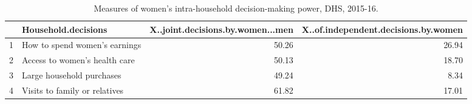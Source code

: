 \begin{table}[ht]
\centering
\caption{Measures of women’s intra-household decision-making power, DHS, 2015-16.} 
\label{tab:A7}
\begin{tabular}{llrr}
  \hline
 & Household.decisions & X..joint.decisions.by.women...men & X..of.independent.decisions.by.women \\ 
  \hline
1 & How to spend women’s earnings & 50.26 & 26.94 \\ 
  2 & Access to women’s health care & 50.13 & 18.70 \\ 
  3 & Large household purchases & 49.24 & 8.34 \\ 
  4 & Visits to family or relatives & 61.82 & 17.01 \\ 
   \hline
\end{tabular}
\end{table}
